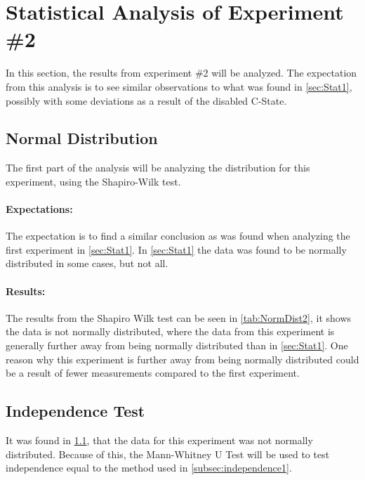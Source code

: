 \section{Statistical Analysis of Experiment \#2}\label{sec:Stat2}
In this section, the results from experiment \#2 will be analyzed. The expectation from this analysis is to see similar observations to what was found in \cref{sec:Stat1}, possibly with some deviations as a result of the disabled C-State. 

\subsection{Normal Distribution}\label{subsec:NormalDist2}

The first part of the analysis will be analyzing the distribution for this experiment, using the Shapiro-Wilk test\cite{razali2011power}.

\paragraph{Expectations:} The expectation is to find a similar conclusion as was found when analyzing the first experiment in \cref{sec:Stat1}. In \cref{sec:Stat1} the data was found to be normally distributed in some cases, but not all.

 


\paragraph{Results:} The results from the Shapiro Wilk test can be seen in \cref{tab:NormDist2}, it shows the data is not normally distributed, where the data from this experiment is generally further away from being normally distributed than in \cref{sec:Stat1}. One reason why this experiment is further away from being normally distributed could be a result of fewer measurements compared to the first experiment.

\subsection{Independence Test}\label{subsec:independence2}
It was found in \cref{subsec:NormalDist2}, that the data for this experiment was not normally distributed. Because of this, the Mann-Whitney U Test\cite{mann1947test} will be used to test independence equal to the method used in \cref{subsec:independence1}.

